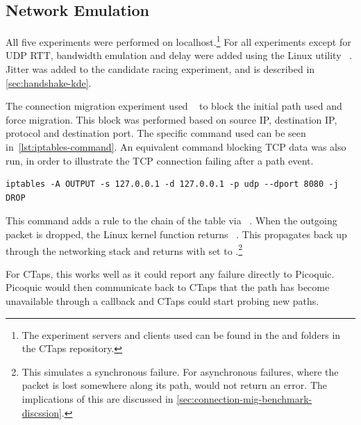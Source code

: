 \subsection{Network Emulation} \label{sec:softwaretools}
All five experiments were performed on localhost.\footnote{
The experiment servers and clients used can be found in the 
and 
folders in the CTaps repository.}
For all experiments except for UDP RTT, bandwidth emulation
and delay were added using the Linux utility
~\cite{tc-netem}. Jitter was added
to the candidate racing experiment, and is
described in \cref{sec:handshake-kde}.

The connection migration experiment used ~\cite{iptables_man} to block the initial
path used and force migration. This block was performed based on
source IP, destination IP, protocol and destination port. The specific command
used can be seen in~\cref{lst:iptables-command}.
An equivalent command blocking
TCP data was also run, in order to illustrate the TCP connection failing after a path event.

\begin{listing}[htbp]
    \begin{verbatim}
iptables -A OUTPUT -s 127.0.0.1 -d 127.0.0.1 -p udp --dport 8080 -j DROP 
\end{verbatim}
\caption[Command to block path using iptables]{
Command to block UDP data from Local Endpoint to file server on localhost using iptables.
}
\label{lst:iptables-command}
\end{listing}

This command adds a rule to the  chain of the  table via
~\cite{iptables_man}. When the outgoing packet is dropped, the Linux kernel
function  returns ~\cite{LinuxKernelNfHookSlow}.
This propagates back up through the networking stack and
 returns  with  set to
.\footnote{
This simulates a synchronous failure. For asynchronous
failures, where the packet is lost somewhere along its path, 
would not return an error. The implications of this are discussed in
\cref{sec:connection-mig-benchmark-discssion}.}

For CTaps, this works well as it could
report any  failure directly to Picoquic.
Picoquic would then communicate back to CTaps that the path has become unavailable through
a callback and CTaps could start probing new paths.

